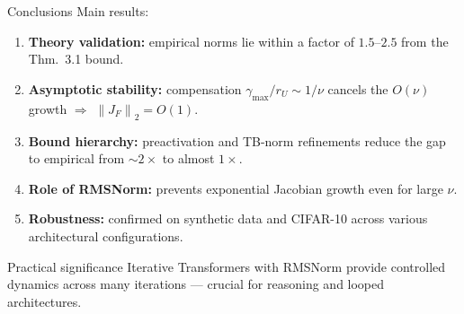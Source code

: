 \documentclass{beamer}
\newcommand{\norm}[1]{\left\|#1\right\|}
\newcommand{\rU}{r_{U}}
\newcommand{\gmax}{\gamma_{\max}}
\begin{document}
\begin{frame}{Conclusions}
    Main results:

    \begin{enumerate}
        \item \textbf{Theory validation:} empirical norms lie within a factor
              of $1.5$--$2.5$ from the Thm.\ 3.1 bound.

        \item \textbf{Asymptotic stability:} compensation $\gmax/\rU \sim 1/\nu$
              cancels the $O(\nu)$ growth $\Rightarrow$ $\norm{J_F}_2 = O(1)$.

        \item \textbf{Bound hierarchy:} preactivation and TB-norm refinements
              reduce the gap to empirical from $\sim 2\times$ to almost $1\times$.

        \item \textbf{Role of RMSNorm:} prevents exponential Jacobian growth
              even for large $\nu$.

        \item \textbf{Robustness:} confirmed on synthetic data and CIFAR-10
              across various architectural configurations.
    \end{enumerate}

    \vspace{0.3em}
    \begin{block}{Practical significance}
        Iterative Transformers with RMSNorm provide controlled dynamics across
        many iterations --- crucial for reasoning and looped architectures.
    \end{block}
\end{frame}
\end{document}
